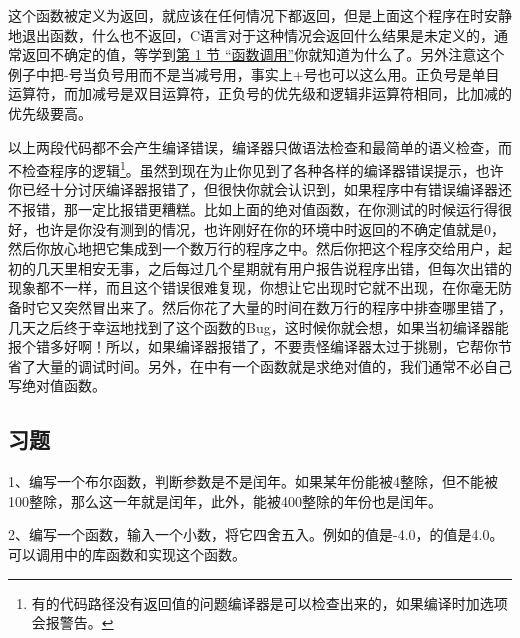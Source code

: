 

这个函数被定义为返回，就应该在任何情况下都返回，但是上面这个程序在时安静地退出函数，什么也不返回，C语言对于这种情况会返回什么结果是未定义的，通常返回不确定的值，等学到\hyperlink{db.ch19s01.id2774377}{第 1 节 “函数调用”}你就知道为什么了。另外注意这个例子中把-号当负号用而不是当减号用，事实上+号也可以这么用。正负号是单目运算符，而加减号是双目运算符，正负号的优先级和逻辑非运算符相同，比加减的优先级要高。



以上两段代码都不会产生编译错误，编译器只做语法检查和最简单的语义检查，而不检查程序的逻辑\footnote[7]{有的代码路径没有返回值的问题编译器是可以检查出来的，如果编译时加选项会报警告。}。虽然到现在为止你见到了各种各样的编译器错误提示，也许你已经十分讨厌编译器报错了，但很快你就会认识到，如果程序中有错误编译器还不报错，那一定比报错更糟糕。比如上面的绝对值函数，在你测试的时候运行得很好，也许是你没有测到的情况，也许刚好在你的环境中时返回的不确定值就是0，然后你放心地把它集成到一个数万行的程序之中。然后你把这个程序交给用户，起初的几天里相安无事，之后每过几个星期就有用户报告说程序出错，但每次出错的现象都不一样，而且这个错误很难复现，你想让它出现时它就不出现，在你毫无防备时它又突然冒出来了。然后你花了大量的时间在数万行的程序中排查哪里错了，几天之后终于幸运地找到了这个函数的Bug，这时候你就会想，如果当初编译器能报个错多好啊！所以，如果编译器报错了，不要责怪编译器太过于挑剔，它帮你节省了大量的调试时间。另外，在中有一个函数就是求绝对值的，我们通常不必自己写绝对值函数。


\subsection*{习题}
%


1、编写一个布尔函数，判断参数是不是闰年。如果某年份能被4整除，但不能被100整除，那么这一年就是闰年，此外，能被400整除的年份也是闰年。



2、编写一个函数，输入一个小数，将它四舍五入。例如的值是-4.\BookSplit{}0，的值是4.\BookSplit{}0。可以调用中的库函数和实现这个函数。

